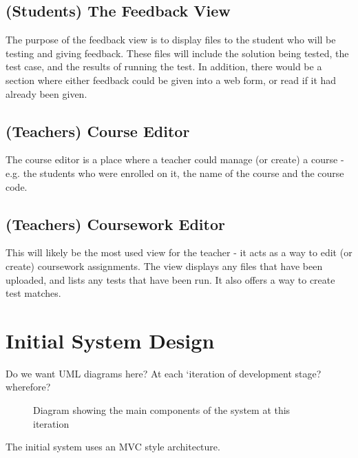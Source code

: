 \documentclass[a4paper,11pt]{report}
\begin{document}
\subsection{(Students) The Feedback View}
The purpose of the feedback view is to display files to the student who will be testing and giving feedback. These files will include the solution being tested, the test case, and the results of running the test. In addition, there would be a section where either feedback could be given into a web form, or read if it had already been given.
\subsection{(Teachers) Course Editor}
The course editor is a place where a teacher could manage (or create) a course - e.g. the students who were enrolled on it, the name of the course and the course code.
\subsection{(Teachers) Coursework Editor}
This will likely be the most used view for the teacher - it acts as a way to edit (or create) coursework assignments. The view displays any files that have been uploaded, and lists any tests that have been run. It also offers a way to create test matches.

\section{Initial System Design}
Do we want UML diagrams here? At each `iteration of development stage? wherefore?
\begin{figure}[ht]
\centering
{}
\caption{Diagram showing the main components of the system at this iteration}
\label{fig:i1sd}
\end{figure}
The initial system uses an MVC style architecture.
\end{document}
